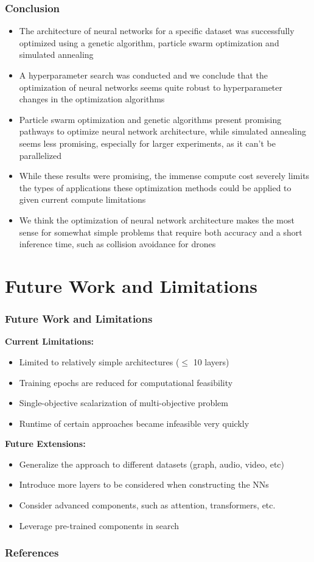 \documentclass{beamer}
\begin{document}
    \begin{frame}
        \frametitle{Conclusion}
        \begin{itemize}
            \small
            \item The architecture of neural networks for a specific dataset was successfully optimized using a genetic algorithm, particle swarm optimization and simulated annealing
            \item A hyperparameter search was conducted and we conclude that the optimization of neural networks seems quite robust to hyperparameter changes in the optimization algorithms
            \item Particle swarm optimization and genetic algorithms present promising pathways to optimize neural network architecture, while simulated annealing seems less promising, especially for larger experiments, as it can't be parallelized
            \item While these results were promising, the immense compute cost severely limits the types of applications these optimization methods could be applied to given current compute limitations
            \item We think the optimization of neural network architecture makes the most sense for somewhat simple problems that require both accuracy and a short inference time, such as collision avoidance for drones
        \end{itemize}
    \end{frame}

    
    \section{Future Work and Limitations}

    \begin{frame}
        \frametitle{Future Work and Limitations}
        \textbf{Current Limitations:}
        \begin{itemize}
            \item Limited to relatively simple architectures ($\leq$ 10 layers)
            \item Training epochs are reduced for computational feasibility
            \item Single-objective scalarization of multi-objective problem
            \item Runtime of certain approaches became infeasible very quickly
        \end{itemize}
        \vspace{2mm}
        \textbf{Future Extensions:}
        \begin{itemize}
            \item Generalize the approach to different datasets (graph, audio, video, etc)
            \item Introduce more layers to be considered when constructing the NNs
            \item Consider advanced components, such as attention, transformers, etc.
            \item Leverage pre-trained components in search
        \end{itemize}
    \end{frame}

    \begin{frame}[allowframebreaks]
        \frametitle{References}
        \printbibliography
    \end{frame}
\end{document}

